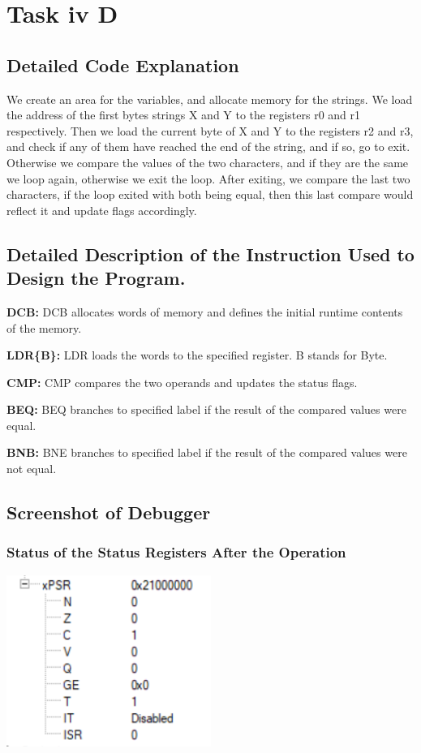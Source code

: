 \documentclass{article}
\begin{document}
\section{Task iv D}

\subsection{Detailed Code Explanation}
We create an area for the variables, and allocate memory for the strings. We load the address of the first bytes strings X and Y to the registers r0 and r1 respectively. Then we load the current byte of X and Y to the registers r2 and r3, and check if any of them have reached the end of the string, and if so, go to exit. Otherwise we compare the values of the two characters, and if they are the same we loop again, otherwise we exit the loop. After exiting, we compare the last two characters, if the loop exited with both being equal, then this last compare would reflect it and update flags accordingly.

\subsection{Detailed Description of the Instruction Used to Design the Program.}

\item \textbf{DCB: }DCB allocates words of memory and defines the initial runtime contents of the memory.
\item \textbf{LDR\{B\}: }LDR loads the words to the specified register. B stands for Byte.
\item \textbf{CMP: }CMP compares the two operands and updates the status flags.
\item \textbf{BEQ: }BEQ branches to specified label if the result of the compared values were equal.
\item \textbf{BNB: }BNE branches to specified label if the result of the compared values were not equal.

\subsection{Screenshot of Debugger}

\subsubsection{Status of the Status Registers After the Operation}

\begin{center}
    \includegraphics[width=0.5\textwidth]{task_iv_D_PSR.png}
\end{center}
\end{document}
